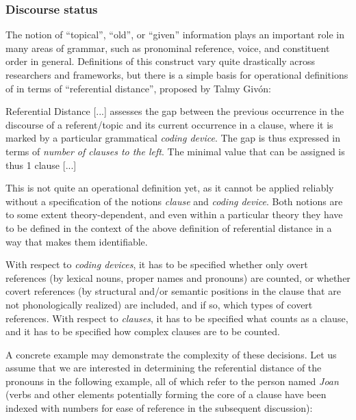 \subsubsection{Discourse status}
\label{sec:operationalizingdiscoursestatus}

The notion of ``topical'', ``old'', or ``given'' information plays an important role in many areas of grammar, such as pronominal reference, voice, and constituent order in general. Definitions of this construct vary quite drastically across researchers and frameworks, but there is a simple basis for operational definitions of  in terms of ``referential distance'', proposed by Talmy Givón:

\begin{exe}
\ex Referential Distance [...] assesses the gap between the previous occurrence in the discourse of a referent/topic and its current occurrence in a clause, where it is marked by a particular grammatical \emph{coding device}. The gap is thus expressed in terms of \emph{number of clauses to the left}. The minimal value that can be assigned is thus 1 clause [...] \citep[13]{givon_topic_1983}
\label{ex:referentialdistance}
\end{exe}

This is not quite an operational definition yet, as it cannot be applied reliably without a specification of the notions \emph{clause} and \emph{coding device}. Both notions are to some extent theory-dependent, and even within a particular theory they have to be defined in the context of the above definition of referential distance in a way that makes them identifiable.

With respect to \emph{coding devices}, it has to be specified whether only overt references (by lexical nouns, proper names and pronouns) are counted, or whether covert references (by structural and/or semantic positions in the clause that are not phonologically realized) are included, and if so, which types of covert references. With respect to \emph{clauses}, it has to be specified what counts as a clause, and it has to be specified how complex clauses are to be counted.

A concrete example may demonstrate the complexity of these decisions. Let us assume that we are interested in determining the referential distance of the pronouns in the following example, all of which refer to the person named \textit{Joan} (verbs and other elements potentially forming the core of a clause have been indexed with numbers for ease of reference in the subsequent discussion):

